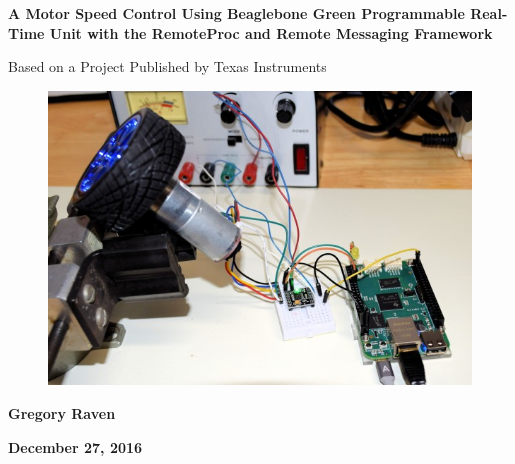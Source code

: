 \thispagestyle{empty}
{\centering\bfseries\color{black}\Huge
A Motor Speed Control Using Beaglebone Green Programmable Real-Time Unit with the RemoteProc and Remote Messaging Framework

Based on a Project Published by Texas Instruments
\par}

\bigskip

\begin{figure}
	\centering
	\includegraphics[width=\textwidth]{photos/intro_view}
\end{figure}

\bigskip
{\centering\bfseries\Large
Gregory Raven
\par}


\bigskip
{\centering\bfseries\LARGE
December 27, 2016
\par}



